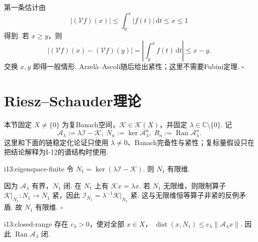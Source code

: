 \begin{FAProof}
第一条估计由
\[
|(\mathcal Vf)(x)|
\leqslant
\int_0^x|f(t)|\,\mathrm{d}t
\leqslant
x
\leqslant1
\]
得到. 若 \(\displaystyle x\geqslant y\)，则
\[
|(\mathcal Vf)(x)-(\mathcal Vf)(y)|
=
\left|\int_y^x f(t)\,\mathrm{d}t\right|
\leqslant
x-y.
\]
交换 \(\displaystyle x,y\) 即得一般情形. Arzelà--Ascoli随后给出紧性；这里不需要Fubini定理.
\hfill\(\square\)
\end{FAProof}

\section{Riesz--Schauder理论}\label{sec:i13-riesz-schauder}

本节固定 \(\displaystyle X\neq\{0\}\) 为复Banach空间，\(\displaystyle \mathcal K\in\mathcal K(X)\)，并固定 \(\displaystyle \lambda\in\mathbb C\setminus\{0\}\). 记
\[
\mathcal A_\lambda := \lambda\mathcal I-\mathcal K, \; N_n:=\ker\mathcal A_\lambda^n, \; R_n:=\operatorname{Ran}\mathcal A_\lambda^n.
\]
这里和下面的链稳定化论证只使用 \(\displaystyle \lambda\neq0\)、Banach完备性与紧性；复标量假设只在把结论解释为I-12的谱结构时使用.

\begin{FALemma}[B][非零特征空间有限维]{i13:eigenspace-finite}
令 \(\displaystyle N_1=\ker(\lambda\mathcal I-\mathcal K)\). 则 \(\displaystyle N_1\) 有限维.
\end{FALemma}

\begin{FAProof}
因为 \(\displaystyle \mathcal A_\lambda\) 有界，\(\displaystyle N_1\) 闭. 在 \(\displaystyle N_1\) 上有 \(\displaystyle \mathcal Kx=\lambda x\). 若 \(\displaystyle N_1\) 无限维，则限制算子 \(\displaystyle \mathcal K|_{N_1}:N_1\to N_1\) 紧，因此
\(\displaystyle \mathcal I_{N_1} = \lambda^{-1}\mathcal K|_{N_1}\)
紧. 这与无限维恒等算子非紧的反例矛盾. 故 \(\displaystyle N_1\) 有限维.
\hfill\(\square\)
\end{FAProof}

\begin{FALemma}[B][到核距离估计与闭值域]{i13:closed-range}
存在 \(\displaystyle c_\lambda>0\)，使对全部 \(\displaystyle x\in X\)，
\(\displaystyle \operatorname{dist}(x,N_1) \leqslant c_\lambda\|\mathcal A_\lambda x\|\).
因此 \(\displaystyle \operatorname{Ran}\mathcal A_\lambda\) 闭.
\end{FALemma}

